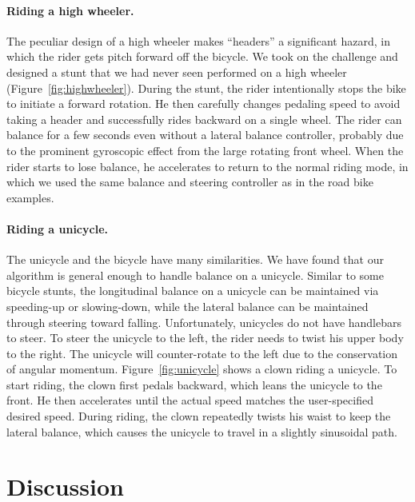 \paragraph{Riding a high wheeler.} The peculiar design of a high wheeler makes ``headers'' a significant hazard, in which the rider gets pitch forward off the bicycle. We took on the challenge and designed a stunt that we had never seen performed on a high wheeler (Figure~\ref{fig:highwheeler}). During the stunt, the rider intentionally stops the bike to initiate a forward rotation. He then carefully changes pedaling speed to avoid taking a header and successfully rides backward on a single wheel. The rider can balance for a few seconds even without a lateral balance controller, probably due to the prominent gyroscopic effect from the large rotating front wheel. When the rider starts to lose balance, he accelerates to return to the normal riding mode, in which we used the same balance and steering controller as in the road bike examples.

\paragraph{Riding a unicycle.} The unicycle and the bicycle have many similarities. We have found that our algorithm is general enough to handle balance on a unicycle. Similar to some bicycle stunts, the longitudinal balance on a unicycle can be maintained via speeding-up or slowing-down, while the lateral balance can be maintained through steering toward falling. Unfortunately, unicycles do not have handlebars to steer. To steer the unicycle to the left, the rider needs to twist his upper body to the right. The unicycle will counter-rotate to the left due to the conservation of angular momentum. Figure~\ref{fig:unicycle} shows a clown riding a unicycle. To start riding, the clown first pedals backward, which leans the unicycle to the front. He then accelerates until the actual speed matches the user-specified desired speed. During riding, the clown repeatedly twists his waist to keep the lateral balance, which causes the unicycle to travel in a slightly sinusoidal path.



\section{Discussion}
\label{sec:Evaluation}

